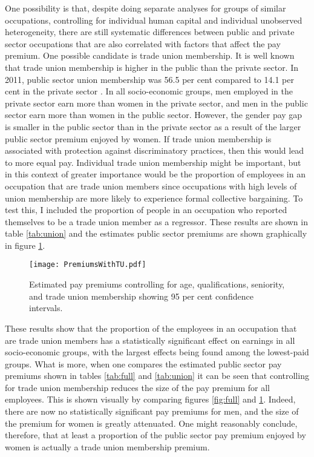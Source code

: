 \documentclass[a4paper,11pt,titlepage]{article}
\begin{document}
One possibility is that, despite doing separate analyses for groups of similar occupations, controlling for individual human capital and individual unobserved heterogeneity, there are still systematic differences between public and private sector occupations that are also correlated with factors that affect the pay premium.  One possible candidate is trade union membership.  It is well known that trade union membership is higher in the public than the private sector.  In 2011, public sector union membership was 56.5 per cent compared to 14.1 per cent in the private sector \citep{BIS2012}. In all socio-economic groups, men employed in the private sector earn more than women in the private sector, and men in the public sector earn more than women in the public sector.  However, the gender pay gap is smaller in the public sector than in the private sector as a result of the larger public sector premium enjoyed by women.  If trade union membership is associated with protection against discriminatory practices, then this would lead to more equal pay.  Individual trade union membership might be important, but in this context of greater importance would be the proportion of employees in an occupation that are trade union members since occupations with high levels of union membership are more likely to experience formal collective bargaining.  To test this, I included the proportion of people in an occupation who reported themselves to be a trade union member as a regressor.  These results are shown in table \ref{tab:union} and the estimates public sector premiums are shown graphically in figure \ref{fig:union}.

\begin{figure}
\texttt{[image: PremiumsWithTU.pdf]}
\caption{Estimated pay premiums controlling for age, qualifications, seniority, and trade union membership showing 95 per cent confidence intervals.\label{fig:union}}
\end{figure}

These results show that the proportion of the employees in an occupation that are trade union members has a statistically significant effect on earnings in all socio-economic groups, with the largest effects being found among the lowest-paid groups.  What is more, when one compares the estimated public sector pay premiums shown in tables \ref{tab:full} and \ref{tab:union} it can be seen that controlling for trade union membership reduces the size of the pay premium for all employees.  This is shown visually by comparing figures \ref{fig:full} and \ref{fig:union}.  Indeed, there are now no statistically significant pay premiums for men, and the size of the premium for women is greatly attenuated.  One might reasonably conclude, therefore, that at least a proportion of the public sector pay premium enjoyed by women is actually a trade union membership premium.
\end{document}
